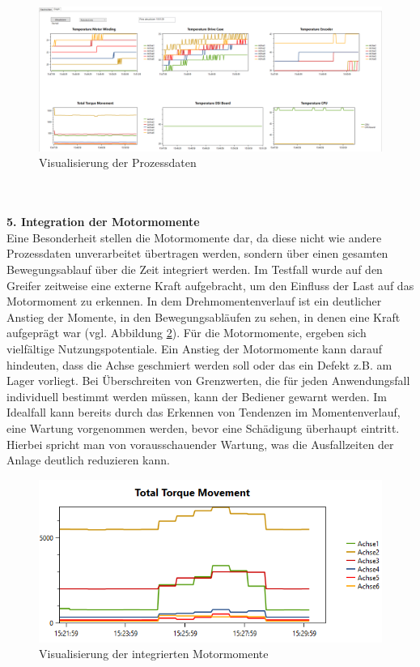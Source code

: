 \documentclass[ a4paper,
                oneside,
                toc=bibliography,
                toc=listof
                ]{scrbook}
\begin{document}
   	\begin{figure}[!h]
   		\centering
   		\includegraphics[width=1\linewidth]{./images/Prozessdaten.png}
   		\caption{Visualisierung der Prozessdaten}
   		\label{fig:Prozessdaten}
   	\end{figure}\\
   	\vspace{0.5\baselineskip}\\
   	\textbf{5. Integration der Motormomente}\\
   	Eine Besonderheit stellen die Motormomente dar, da diese nicht wie andere Prozessdaten unverarbeitet übertragen werden, sondern über einen gesamten Bewegungsablauf über die Zeit integriert werden. Im Testfall wurde auf den Greifer zeitweise eine externe Kraft aufgebracht, um den Einfluss der Last auf das Motormoment zu erkennen. In dem Drehmomentenverlauf ist ein deutlicher Anstieg der Momente, in den Bewegungsabläufen zu sehen, in denen eine Kraft aufgeprägt war (vgl. Abbildung \ref{fig:Motormomente}). Für die Motormomente, ergeben sich vielfältige Nutzungspotentiale. Ein Anstieg der Motormomente kann darauf hindeuten, dass die Achse geschmiert werden soll oder das ein Defekt z.B. am Lager vorliegt. Bei Überschreiten von Grenzwerten, die für jeden Anwendungsfall individuell bestimmt werden müssen, kann der Bediener gewarnt werden. Im Idealfall kann bereits durch das Erkennen von Tendenzen im Momentenverlauf, eine Wartung vorgenommen werden, bevor eine Schädigung überhaupt eintritt. Hierbei spricht man von vorausschauender Wartung, was die Ausfallzeiten der Anlage deutlich reduzieren kann.
   	\clearpage
   	\begin{figure}[!h]
   		\centering
   		\includegraphics[width=0.7\linewidth]{./images/Motormomente.png}
   		\caption{Visualisierung der integrierten Motormomente}
   		\label{fig:Motormomente}
   	\end{figure}
\end{document}
